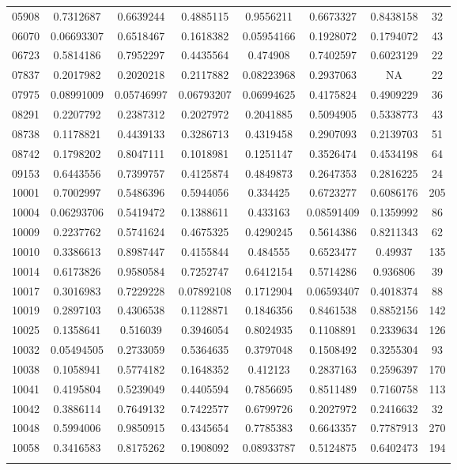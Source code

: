 \begin{anexosenv}
\begin{table}[H]
{\begin{tabular}{cccccccc}
05908 & 0.7312687 & 0.6639244 & 0.4885115 & 0.9556211 & 0.6673327 & 0.8438158 & 32 \\ 
06070 & 0.06693307 & 0.6518467 & 0.1618382 & 0.05954166 & 0.1928072 & 0.1794072 & 43 \\ 
06723 & 0.5814186 & 0.7952297 & 0.4435564 & 0.474908 & 0.7402597 & 0.6023129 & 22 \\ 
07837 & 0.2017982 & 0.2020218 & 0.2117882 & 0.08223968 & 0.2937063 & NA & 22 \\ 
07975 & 0.08991009 & 0.05746997 & 0.06793207 & 0.06994625 & 0.4175824 & 0.4909229 & 36 \\ 
08291 & 0.2207792 & 0.2387312 & 0.2027972 & 0.2041885 & 0.5094905 & 0.5338773 & 43 \\ 
08738 & 0.1178821 & 0.4439133 & 0.3286713 & 0.4319458 & 0.2907093 & 0.2139703 & 51 \\ 
08742 & 0.1798202 & 0.8047111 & 0.1018981 & 0.1251147 & 0.3526474 & 0.4534198 & 64 \\ 
09153 & 0.6443556 & 0.7399757 & 0.4125874 & 0.4849873 & 0.2647353 & 0.2816225 & 24 \\ 
10001 & 0.7002997 & 0.5486396 & 0.5944056 & 0.334425 & 0.6723277 & 0.6086176 & 205 \\ 
10004 & 0.06293706 & 0.5419472 & 0.1388611 & 0.433163 & 0.08591409 & 0.1359992 & 86 \\ 
10009 & 0.2237762 & 0.5741624 & 0.4675325 & 0.4290245 & 0.5614386 & 0.8211343 & 62 \\ 
10010 & 0.3386613 & 0.8987447 & 0.4155844 & 0.484555 & 0.6523477 & 0.49937 & 135 \\ 
10014 & 0.6173826 & 0.9580584 & 0.7252747 & 0.6412154 & 0.5714286 & 0.936806 & 39 \\ 
10017 & 0.3016983 & 0.7229228 & 0.07892108 & 0.1712904 & 0.06593407 & 0.4018374 & 88 \\ 
10019 & 0.2897103 & 0.4306538 & 0.1128871 & 0.1846356 & 0.8461538 & 0.8852156 & 142 \\ 
10025 & 0.1358641 & 0.516039 & 0.3946054 & 0.8024935 & 0.1108891 & 0.2339634 & 126 \\ 
10032 & 0.05494505 & 0.2733059 & 0.5364635 & 0.3797048 & 0.1508492 & 0.3255304 & 93 \\ 
10038 & 0.1058941 & 0.5774182 & 0.1648352 & 0.412123 & 0.2837163 & 0.2596397 & 170 \\ 
10041 & 0.4195804 & 0.5239049 & 0.4405594 & 0.7856695 & 0.8511489 & 0.7160758 & 113 \\ 
10042 & 0.3886114 & 0.7649132 & 0.7422577 & 0.6799726 & 0.2027972 & 0.2416632 & 32 \\ 
10048 & 0.5994006 & 0.9850915 & 0.4345654 & 0.7785383 & 0.6643357 & 0.7787913 & 270 \\
10058 & 0.3416583 & 0.8175262 & 0.1908092 & 0.08933787 & 0.5124875 & 0.6402473 & 194 \\ \hline
\label{tab:nosocssemrotacaoI}
\end{tabular}
}
\end{table}


\end{anexosenv}
